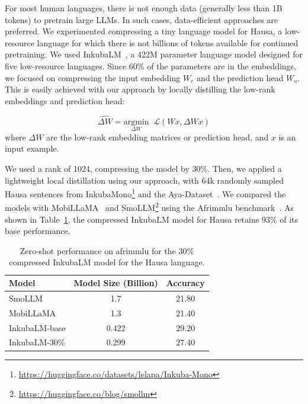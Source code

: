 \documentclass[11pt]{article}
\begin{document}
For most human languages, there is not enough data (generally less than 1B
tokens) to pretrain large LLMs. In such cases, data-efficient approaches are
preferred. We experimented compressing a tiny language model for Hausa, a
low-resource language for which there is not billions of tokens available for
continued pretraining. We used InkubaLM~\citep{tonja2024inkubalm}, a 422M
parameter language model designed for five low-resource languages. Since 60\%
of the parameters are in the embeddings, we focused on compressing the input
embedding $W_{e}$ and the prediction head $W_{o}$. This is easily achieved with
our approach by locally distilling the low-rank embeddings and prediction head:

\[
\widehat{\Delta W} = \underset{{\Delta W}}{\mathrm{argmin}} \;\; \mathcal{L}(Wx, \Delta Wx)
\]
where $\Delta W$ are the low-rank embedding matrices or prediction head, and $x$ is an input example.

We used a rank of 1024, compressing the model by 30\%. Then, we applied a
lightweight local distillation using our approach, with 64k randomly sampled
Hausa sentences from InkubaMono\footnote{\href{https://huggingface.co/datasets/lelapa/Inkuba-Mono}{https://huggingface.co/datasets/lelapa/Inkuba-Mono}} and the Aya-Dataset~\citep{singh2024aya}. We compared the models with MobiLLaMA~\citep{thawakar2024mobillama} and
SmoLLM\footnote{\href{https://huggingface.co/blog/smollm}{https://huggingface.co/blog/smollm}} using the Afrimmlu benchmark~\citep{afrimmlu}. As shown in Table~\ref{tab:inkuba}, the compressed InkubaLM model for Hausa retains 93\% of its base performance.

\begin{table}[h!]
    \centering
    {\small{
    \begin{tabular}{lcc}
    \toprule
    \textbf{Model } & \textbf{Model Size (Billion)} & \textbf{Accuracy}  \\ 
    \midrule
    SmoLLM & 1.7 & 21.80  \\ 
    MobiLLaMA & 1.3 & 21.40  \\  
    \midrule
    InkubaLM-base & 0.422 & 29.20 \\
    InkubaLM-30\% & 0.299 & 27.40  \\ 
    \bottomrule
    \end{tabular}
    }}
    \caption{Zero-shot performance on afrimmlu for the 30\% compressed InkubaLM model for the Hausa language.}
\label{tab:inkuba}
\end{table}
\end{document}
